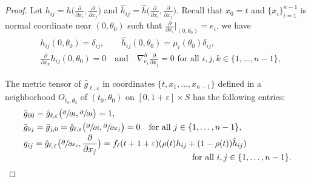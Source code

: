 \documentclass[10pt]{amsart}
\theoremstyle{definition}
\let\eps\varepsilon
\renewcommand{\>}{{\rangle}}
\newcommand{\<}{{\langle}}
\begin{document}
\begin{proof}
Let $h_{ij}=h \bigl(\frac{\partial}{\partial x_i},\frac{\partial}{\partial x_j} \bigr)$ and ${\hat h}_{ij}={\hat h} \bigl(\frac{\partial}{\partial x_i},\frac{\partial}{\partial x_j} \bigr)$. Recall that $x_0=t$ and $\{x_i\}_{i=1}^{n-1}$ is normal coordinate near $(0,\theta_0)$ such that $\frac{\partial}{\partial x_i}|_{(0,\theta_0)}=e_i$, we have
\begin{equation}\label{eq: normal_coordinates}
\begin{aligned}
&h_{ij}(0,\theta_0)=\delta_{ij}, \qquad {\hat h}_{ij}(0,\theta_0) = \mu_i(\theta_0)\delta_{ij},\\
&\frac{\partial}{\partial x_k}h_{ij}(0,\theta_0)=0 \quad \text{and} \quad \nabla^h_{e_i}\frac{\partial}{\partial x_j}=0 \text{ for all } i,j,k\in\{1,\ldots,n-1\},
\end{aligned}
\end{equation}

The metric tensor of $\hat g_{\ell,\eps}$ in coordinates $\{t, x_1,\ldots, x_{n-1}\}$ defined in a neighborhood $O_{t_0,\theta_0}$ of $(t_0,\theta_0)$ on $[0,1+\eps]\times S$ has the following entries:\vspace*{-3pt}
\begin{align*}
&\bar g_{00} = \hat g_{\ell,\eps} \bigl(\sfrac{\partial}{\partial t}, \sfrac{\partial}{\partial t} \bigr)=1,\\
&\bar g_{0j} = \bar g_{j,0}=\hat g_{\ell,\eps} \bigl(\sfrac{\partial}{\partial t},\sfrac{\partial}{\partial x_j} \bigr)=0 \quad\text{for all } j\in\{1,\ldots,n-1\},\\[-2pt]
&\bar g_{ij} = \hat g_{\ell,\eps} \bigl(\sfrac{\partial}{\partial x_i},\frac{\partial}{\partial x_j} \bigr) = f_\ell(t+1+\eps)(\rho(t)h_{ij}+(1-\rho(t))\hat h_{ij})\\[-5pt]
&\hspace*{7cm}\text{for all } i,j\in\{1,\ldots, n-1\}.
\end{align*}


\end{proof}
\end{document}

